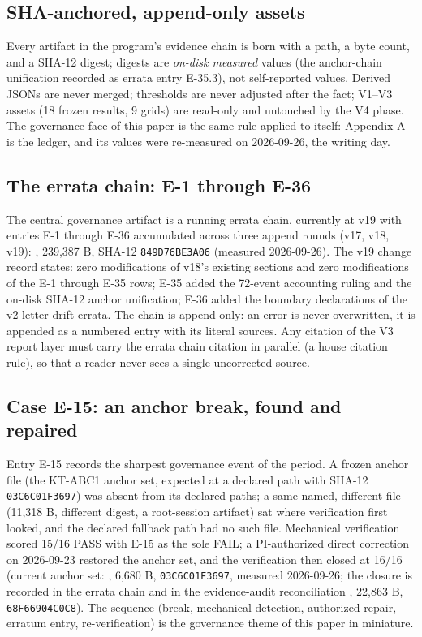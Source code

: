 \documentclass[11pt]{article}
\newcommand{\sha}[1]{\texttt{#1}}
\begin{document}
\subsection{SHA-anchored, append-only assets}
\noindent Every artifact in the program's evidence chain is born with a path, a byte count, and a SHA-12 digest; digests are \emph{on-disk measured} values (the anchor-chain unification recorded as errata entry E-35.3), not self-reported values. Derived JSONs are never merged; thresholds are never adjusted after the fact; V1–V3 assets (18 frozen results, 9 grids) are read-only and untouched by the V4 phase. The governance face of this paper is the same rule applied to itself: Appendix A is the ledger, and its values were re-measured on 2026-09-26, the writing day.\par
\subsection{The errata chain: E-1 through E-36}
\noindent The central governance artifact is a running errata chain, currently at v19 with entries E-1 through E-36 accumulated across three append rounds (v17, v18, v19): , 239,387 B, SHA-12 \sha{849D76BE3A06} (measured 2026-09-26). The v19 change record states: zero modifications of v18's existing sections and zero modifications of the E-1 through E-35 rows; E-35 added the 72-event accounting ruling and the on-disk SHA-12 anchor unification; E-36 added the boundary declarations of the v2-letter drift errata. The chain is append-only: an error is never overwritten, it is appended as a numbered entry with its literal sources. Any citation of the V3 report layer must carry the errata chain citation in parallel (a house citation rule), so that a reader never sees a single uncorrected source.\par
\subsection{Case E-15: an anchor break, found and repaired}
\noindent Entry E-15 records the sharpest governance event of the period. A frozen anchor file (the KT-ABC1 anchor set, expected at a declared path with SHA-12 \sha{03C6C01F3697}) was absent from its declared paths; a same-named, different file (11,318 B, different digest, a root-session artifact) sat where verification first looked, and the declared fallback path had no such file. Mechanical verification scored 15/16 PASS with E-15 as the sole FAIL; a PI-authorized direct correction on 2026-09-23 restored the anchor set, and the verification then closed at 16/16 (current anchor set: , 6,680 B, \sha{03C6C01F3697}, measured 2026-09-26; the closure is recorded in the errata chain and in the evidence-audit reconciliation , 22,863 B, \sha{68F66904C0C8}). The sequence (break, mechanical detection, authorized repair, erratum entry, re-verification) is the governance theme of this paper in miniature.\par
\end{document}
